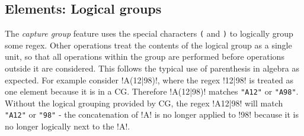 \subsection*{Elements: Logical groups}
\begin{description}  \itemsep -1pt
\item[CG:] The \emph{capture group} feature uses the special characters \verb!(! and \verb!)! to logically group some regex.  Other operations treat the contents of the logical group as a single unit, so that all operations within the group are performed before operations outside it are considered.  This follows the typical use of parenthesis in algebra as expected.  For example consider \cverb!A(12|98)!, where the regex \cverb!12|98! is treated as one element because it is in a CG.  Therefore \cverb!A(12|98)! matches \verb!"A12"! or \verb!"A98"!.  Without the logical grouping provided by CG, the regex \cverb!A12|98! will match \verb!"A12"! or \verb!"98"! - the concatenation of \cverb!A! is no longer applied to \cverb!98! because it is no longer logically next to the \cverb!A!.


\end{description}
